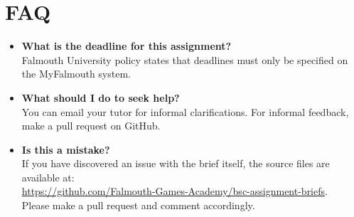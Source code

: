 \documentclass{../../fal_assignment}
\begin{document}
\section*{FAQ}

\begin{itemize}
	\item 	\textbf{What is the deadline for this assignment?} \\ 
    		Falmouth University policy states that deadlines must only be specified on the MyFalmouth system.
    		
	\item 	\textbf{What should I do to seek help?} \\ 
    		You can email your tutor for informal clarifications. For informal feedback, make a pull request on GitHub. 
    		
    	\item 	\textbf{Is this a mistake?} \\ 	
    		If you have discovered an issue with the brief itself, the source files are available at: \\
    		\url{https://github.com/Falmouth-Games-Academy/bsc-assignment-briefs}.\\
    		 Please make a pull request and comment accordingly.
\end{itemize}

\renewcommand{\refname}{Papers}
\nocite{*}


%
\end{document}
